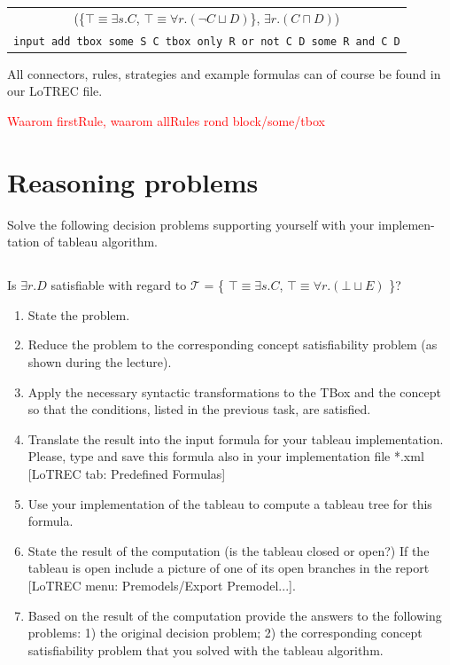 \documentclass[11pt]{article} %
\begin{document}
\begin{table}[h]
\begin{center}
\begin{tabular}{c}
(\{$\top \equiv \exists s.C$, $\top \equiv \forall r.(\neg C \sqcup D)$\}, $\exists r.(C \sqcap D)$)\\
\texttt{input add tbox some S C tbox only R or not C D some R and C D}\\
\end{tabular}
\end{center}
\end{table}

All connectors, rules, strategies and example formulas can of course be found in our LoTREC file.

\textcolor{red}{Waarom firstRule, waarom allRules rond block/some/tbox}

\section{Reasoning problems}
\label{sec:reasoning}

Solve the following decision problems supporting yourself with your implemen-
tation of tableau algorithm.

\subsection{}

\begin{center}
Is $\exists r.D$ satisfiable with regard to $\mathcal{T}$ = \{ $\top \equiv \exists s.C$, $\top \equiv \forall r.(\bot \sqcup E)$ \}?
\end{center}

\begin{enumerate}
\item State the problem.
\item Reduce the problem to the corresponding concept satisfiability problem (as shown during the lecture).
\item Apply the necessary syntactic transformations to the TBox and the concept so that the conditions, listed in the previous task, are satisfied.
\item Translate the result into the input formula for your tableau implementation. Please, type and save this formula also in your implementation file *.xml [LoTREC tab: Predefined Formulas]
\item Use your implementation of the tableau to compute a tableau tree for this formula.
\item State the result of the computation (is the tableau closed or open?) If the tableau is open include a picture of one of its open branches in the report [LoTREC menu: Premodels/Export Premodel...].
\item Based on the result of the computation provide the answers to the following problems: 1) the original decision problem; 2) the corresponding concept satisfiability problem that you solved with the tableau algorithm.
\end{enumerate}
\end{document}
